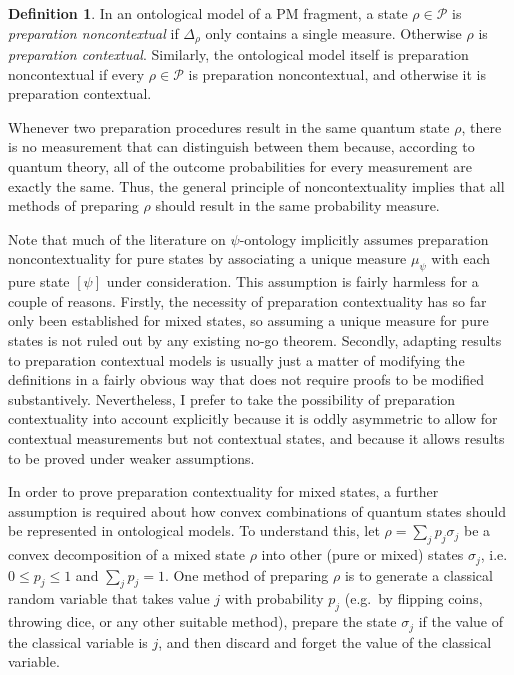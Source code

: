 \documentclass[DIV=calc,fontsize=12pt]{scrartcl} %
\theoremstyle{definition}
\newtheorem{definition}{Definition}[section]
\theoremstyle{plain}
\newcommand{\Proj}[1]{\ensuremath{\left [ #1 \right ]}}
\begin{document}
\begin{definition}
In an ontological model of a PM fragment, a state $\rho \in
\mathcal{P}$ is \emph{preparation noncontextual} if $\Delta_{\rho}$
only contains a single measure.  Otherwise $\rho$ is
\emph{preparation contextual}.  Similarly, the ontological model
itself is preparation noncontextual if every $\rho \in \mathcal{P}$
is preparation noncontextual, and otherwise it is preparation
contextual.
\end{definition}

Whenever two preparation procedures result in the same quantum state
$\rho$, there is no measurement that can distinguish between them
because, according to quantum theory, all of the outcome probabilities
for every measurement are exactly the same.  Thus, the general
principle of noncontextuality implies that all methods of preparing
$\rho$ should result in the same probability measure.

Note that much of the literature on $\psi$-ontology implicitly assumes
preparation noncontextuality for pure states by associating a unique
measure $\mu_{\psi}$ with each pure state $\Proj{\psi}$ under
consideration.  This assumption is fairly harmless for a couple of
reasons.  Firstly, the necessity of preparation contextuality has so
far only been established for mixed states, so assuming a unique
measure for pure states is not ruled out by any existing no-go
theorem.  Secondly, adapting results to preparation contextual models
is usually just a matter of modifying the definitions in a fairly
obvious way that does not require proofs to be modified substantively.
Nevertheless, I prefer to take the possibility of preparation
contextuality into account explicitly because it is oddly asymmetric
to allow for contextual measurements but not contextual states, and
because it allows results to be proved under weaker assumptions.

In order to prove preparation contextuality for mixed states, a
further assumption is required about how convex combinations of
quantum states should be represented in ontological models.  To
understand this, let $\rho = \sum_j p_j \sigma_j$ be a convex
decomposition of a mixed state $\rho$ into other (pure or mixed)
states $\sigma_j$, i.e. $0 \leq p_j \leq 1$ and $\sum_j p_j = 1$.  One
method of preparing $\rho$ is to generate a classical random variable
that takes value $j$ with probability $p_j$ (e.g.\ by flipping coins,
throwing dice, or any other suitable method), prepare the state
$\sigma_j$ if the value of the classical variable is $j$, and then
discard and forget the value of the classical variable.
\end{document}
